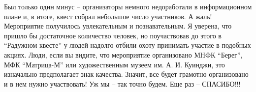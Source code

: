 Был только один минус – организаторы немного недоработали в информационном
плане и, в итоге, квест собрал небольшое число участников. А жаль! Мероприятие
получилось увлекательным и познавательным. Я уверена, что пришло бы достаточное
количество человек, но поучаствовав до этого в \enquote{Радужном квесте} у людей
надолго отбили охоту принимать участие в подобных акциях. Люди, если вы видите,
что мероприятие организовано МНФК \enquote{Берег}, МФК \enquote{Матрица-М} или художественным
музеем им. А. И. Куинджи, это изначально предполагает знак качества. Значит, все
будет грамотно организовано и в нем нужно участвовать! Уж мы – так точно будем.
Еще раз – СПАСИБО!!!

